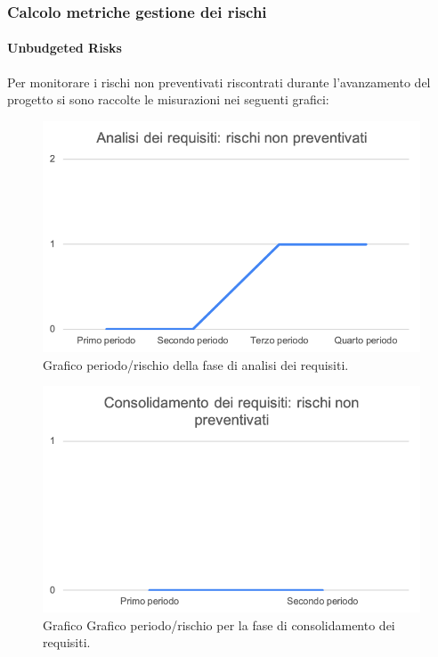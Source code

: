\subsubsection{Calcolo metriche gestione dei rischi}

\paragraph{Unbudgeted Risks}
Per monitorare i rischi non preventivati riscontrati durante l'avanzamento del progetto si sono raccolte le misurazioni nei seguenti grafici:

	\begin{figure}[H]
		\centering
		\includegraphics[width=0.8\linewidth]{./res/images/RischiNonPrevent_1.png}
		\caption{Grafico periodo/rischio della fase di analisi dei requisiti.}
		\label{fig:Grafico periodo/rischio nel periodo di analisi dei requisiti.}
	\end{figure}

	\begin{figure}[H]
			\centering
			\includegraphics[width=0.8\linewidth]{./res/images/RischiNonPrevent_2.png}
			\caption{Grafico Grafico periodo/rischio per la fase di consolidamento dei requisiti.}
			\label{fig:Grafico periodo/rischio per la fase di consolidamento dei requisiti.}
	\end{figure}

